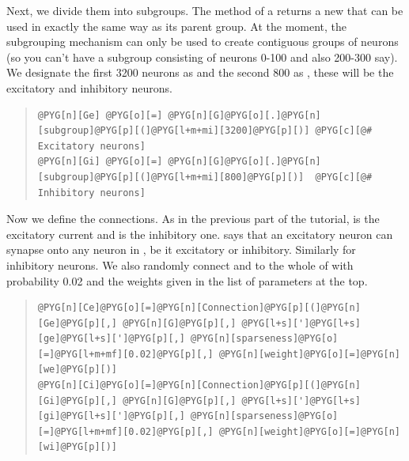\documentclass[letterpaper,10pt,english]{manual}
\begin{document}
Next, we divide them into subgroups. The \hyperlink{brian.NeuronGroup.subgroup}{} method of a
\hyperlink{brian.NeuronGroup}{} returns a new \hyperlink{brian.NeuronGroup}{} that can be used in
exactly the same way as its parent group. At the moment, the
subgrouping mechanism can only be used to create contiguous
groups of neurons (so you can't have a subgroup consisting
of neurons 0-100 and also 200-300 say). We designate the
first 3200 neurons as  and the second 800 as , these
will be the excitatory and inhibitory neurons.
\begin{quote}

\begin{Verbatim}[commandchars=@\[\]]
@PYG[n][Ge] @PYG[o][=] @PYG[n][G]@PYG[o][.]@PYG[n][subgroup]@PYG[p][(]@PYG[l+m+mi][3200]@PYG[p][)] @PYG[c][@# Excitatory neurons]
@PYG[n][Gi] @PYG[o][=] @PYG[n][G]@PYG[o][.]@PYG[n][subgroup]@PYG[p][(]@PYG[l+m+mi][800]@PYG[p][)]  @PYG[c][@# Inhibitory neurons]
\end{Verbatim}
\end{quote}

Now we define the connections. As in the previous part of the
tutorial,  is the excitatory current and  is the inhibitory
one.  says that an excitatory neuron can synapse onto any
neuron in , be it excitatory or inhibitory. Similarly for
inhibitory neurons. We also randomly connect  and  to the whole of  with
probability 0.02 and the weights given in the list of
parameters at the top.
\begin{quote}

\begin{Verbatim}[commandchars=@\[\]]
@PYG[n][Ce]@PYG[o][=]@PYG[n][Connection]@PYG[p][(]@PYG[n][Ge]@PYG[p][,] @PYG[n][G]@PYG[p][,] @PYG[l+s][']@PYG[l+s][ge]@PYG[l+s][']@PYG[p][,] @PYG[n][sparseness]@PYG[o][=]@PYG[l+m+mf][0.02]@PYG[p][,] @PYG[n][weight]@PYG[o][=]@PYG[n][we]@PYG[p][)]
@PYG[n][Ci]@PYG[o][=]@PYG[n][Connection]@PYG[p][(]@PYG[n][Gi]@PYG[p][,] @PYG[n][G]@PYG[p][,] @PYG[l+s][']@PYG[l+s][gi]@PYG[l+s][']@PYG[p][,] @PYG[n][sparseness]@PYG[o][=]@PYG[l+m+mf][0.02]@PYG[p][,] @PYG[n][weight]@PYG[o][=]@PYG[n][wi]@PYG[p][)]
\end{Verbatim}
\end{quote}
\end{document}
